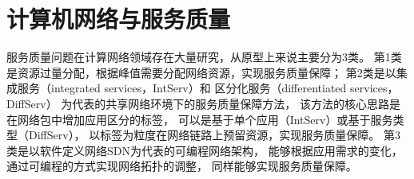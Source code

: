 %
%
%
%
%

\section{计算机网络与服务质量}
\label{sec:background:sdn}

服务质量问题在计算网络领域存在大量研究，从原型上来说主要分为3类。
第1类是资源过量分配，根据峰值需要分配网络资源，实现服务质量保障；
第2类是以集成服务（integrated services，IntServ）\cite{IntServ}和
区分化服务（differentiated services，DiffServ）\cite{DiffServ}
为代表的共享网络环境下的服务质量保障方法，
该方法的核心思路是在网络包中增加应用区分的标签，
可以是基于单个应用（IntServ）或基于服务类型（DiffServ），
以标签为粒度在网络链路上预留资源，实现服务质量保障。
第3类是以软件定义网络SDN\cite{SDN}为代表的可编程网络架构，
能够根据应用需求的变化，通过可编程的方式实现网络拓扑的调整，
同样能够实现服务质量保障。

